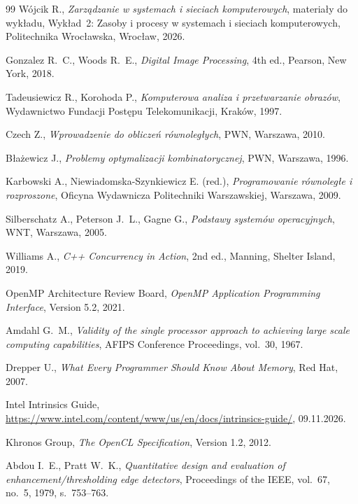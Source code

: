 \documentclass[12pt,a4paper]{article}
\begin{document}

\FloatBarrier
\begin{thebibliography}{99}
	Wójcik R., \emph{Zarządzanie w systemach i sieciach komputerowych}, materiały do wykładu, Wykład~2: Zasoby i procesy w systemach i sieciach komputerowych, Politechnika Wrocławska, Wrocław, 2026.

	Gonzalez R.~C., Woods R.~E., \emph{Digital Image Processing}, 4th ed., Pearson, New York, 2018.

	Tadeusiewicz R., Korohoda P., \emph{Komputerowa analiza i przetwarzanie obrazów}, Wydawnictwo Fundacji Postępu Telekomunikacji, Kraków, 1997.

	Czech Z., \emph{Wprowadzenie do obliczeń równoległych}, PWN, Warszawa, 2010.

	Błażewicz J., \emph{Problemy optymalizacji kombinatorycznej}, PWN, Warszawa, 1996.

	Karbowski A., Niewiadomska-Szynkiewicz E. (red.), \emph{Programowanie równoległe i rozproszone}, Oficyna Wydawnicza Politechniki Warszawskiej, Warszawa, 2009.

	Silberschatz A., Peterson J.~L., Gagne G., \emph{Podstawy systemów operacyjnych}, WNT, Warszawa, 2005.

	Williams A., \emph{C++ Concurrency in Action}, 2nd ed., Manning, Shelter Island, 2019.

	OpenMP Architecture Review Board, \emph{OpenMP Application Programming Interface}, Version 5.2, 2021.

	Amdahl G.~M., \emph{Validity of the single processor approach to achieving large scale computing capabilities}, AFIPS Conference Proceedings, vol.~30, 1967.

	Drepper U., \emph{What Every Programmer Should Know About Memory}, Red Hat, 2007.

	Intel Intrinsics Guide, \url{https://www.intel.com/content/www/us/en/docs/intrinsics-guide/}, 09.11.2026.

	Khronos Group, \emph{The OpenCL Specification}, Version 1.2, 2012.

	Abdou I.~E., Pratt W.~K., \emph{Quantitative design and evaluation of enhancement/thresholding edge detectors}, Proceedings of the IEEE, vol.~67, no.~5, 1979, s.~753--763.


\end{thebibliography}
\end{document}
